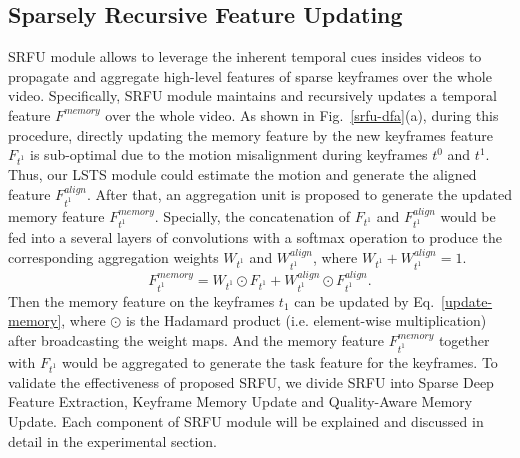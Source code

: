 \documentclass[runningheads]{llncs}
\begin{document}
\subsection{Sparsely Recursive Feature Updating}\label{subsec:SRFU}
SRFU module allows to leverage the inherent temporal cues insides videos to propagate and aggregate high-level features of sparse keyframes over the whole video.
Specifically, SRFU module maintains and recursively updates a temporal feature $F^{memory}$ over the whole video. As shown in Fig.~\ref{srfu-dfa}(a), during this procedure, directly updating the memory feature by the new keyframes feature $F_{t^1}$ is sub-optimal due to the motion misalignment during keyframes $t^0$ and $t^1$. Thus, our LSTS module could estimate the motion and generate the aligned feature $F_{t^1}^{align}$.
After that, an aggregation unit is proposed to generate the updated memory feature $F_{t^1}^{memory}$. 
Specially, the concatenation of $F_{t^1}$ and $F_{t^1}^{align}$ would be fed into a several layers of convolutions with a softmax operation to produce the corresponding aggregation weights $W_{t^1}$ and $W_{t^1}^{align}$, where $W_{t^1} + W_{t^1}^{align} = 1$.
\begin{equation}
 F_{t^1}^{memory} = W_{t^1} \odot F_{t^1}  + W_{t^1}^{align} \odot F_{t^1}^{align}.
\label{update-memory}
\end{equation}
Then the memory feature on the keyframes $t_1$ can be updated by Eq.~\ref{update-memory}, where $\odot$ is the Hadamard product (i.e. element-wise multiplication) after broadcasting the weight maps. And the memory feature $F_{t^1}^{memory}$ together with $F_{t^1}$ would be aggregated to generate the task feature for the keyframes. To validate the effectiveness of proposed SRFU, we divide SRFU into Sparse Deep Feature Extraction, Keyframe Memory Update and Quality-Aware Memory Update. Each component of SRFU module will be explained and discussed in detail in the experimental section.
\end{document}
